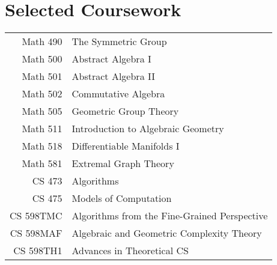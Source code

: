 \documentclass[11pt,a4paper,sans]{moderncv}
\begin{document}



\section{Selected Coursework}
{
\setlength{\tabcolsep}{6pt}
\begin{tabular}{rl}
  Math 490 & The Symmetric Group                                                          \\
  Math 500 & Abstract Algebra I                                                           \\
  Math 501 & Abstract Algebra II                                                          \\
  Math 502 & Commutative Algebra                                                          \\
  Math 505 & Geometric Group Theory                                                       \\
  Math 511 & Introduction to Algebraic Geometry                                           \\
  Math 518 & Differentiable Manifolds I                                                   \\
  Math 581 & Extremal Graph Theory                                                        \\
  CS 473 & Algorithms                                                                     \\
  CS 475 & Models of Computation                                                          \\
  CS 598TMC & Algorithms from the Fine-Grained Perspective                                \\
  CS 598MAF & Algebraic and Geometric Complexity Theory                                   \\
  CS 598TH1 & Advances in Theoretical CS                                                  \\
\end{tabular}
}
\end{document}
